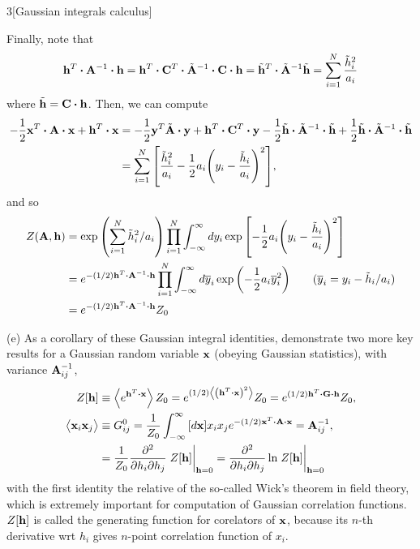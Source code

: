 \documentclass[12pt]{article}
\begin{document}
\begin{problem}{3}[Gaussian integrals calculus]
\begin{solution}
Finally, note that
\begin{equation}
    \vb{h}^T\vdot\vb{A}^{-1}\vdot\vb{h}
    =\vb{h}^T\vdot\vb{C}^T\vdot\tilde{\vb{A}}^{-1}\vdot\vb{C}\vdot\vb{h}
    =\tilde{\vb{h}}^T\vdot\tilde{\vb{A}}^{-1}\tilde{\vb{h}}
    =\sum_{i=1}^N\frac{\tilde{h}_i^2}{a_i}
\end{equation}
where $\tilde{\vb{h}}=\vb{C}\vdot\vb{h}$.  Then, we can compute
\begin{align}
    -\frac12\vb{x}^T\vdot\vb{A}\vdot\vb{x}+\vb{h}^T\vdot\vb{x}
    &=-\frac12\vb{y}^T\tilde{\vb{A}}\vdot\vb{y}
    +\vb{h}^T\vdot\vb{C}^T\vdot\vb{y}
    -\frac12\tilde{\vb{h}}\vdot\tilde{\vb{A}}^{-1}\vdot\tilde{\vb{h}}
    +\frac12\tilde{\vb{h}}\vdot\tilde{\vb{A}}^{-1}\vdot\tilde{\vb{h}}
    \notag\\
    &=\sum_{i=1}^N\qty[\frac{\tilde{h}_i^2}{a_i}-\frac12a_i\qty(y_i-\frac{\tilde{h}_i}{a_i})^2],
\end{align}
and so
\begin{align}
    Z(\vb{A},\vb{h})
    &=\exp\qty(\sum_{i=1}^{N}\tilde{h}_i^2/a_i)
    \prod_{i=1}^N\int_{-\infty}^\infty
    dy_i\exp\qty[-\frac12a_i\qty(y_i-\frac{\tilde{h}_i}{a_i})^2]\notag\\
    &=e^{-(1/2)\vb{h}^T\vdot\vb{A}^{-1}\vdot\vb{h}}
    \prod_{i=1}^N\int_{-\infty}^\infty
    d\overline{y}_i\exp\qty(-\frac12a_i\overline{y}_i^2)\tag{$\overline{y}_i=y_i-\tilde{h}_i/a_i$}\\
    &=e^{-(1/2)\vb{h}^T\vdot\vb{A}^{-1}\vdot\vb{h}}Z_0
\end{align}
\end{solution}

(e) As a corollary of these Gaussian integral identities, demonstrate two more
key results for a Gaussian random variable $\vb{x}$ (obeying Gaussian
statistics), with variance $\vb{A}_{ij}^{-1}$,
\begin{align}
    Z\qty[\vb{h}]&\equiv\expval{e^{\vb{h}^T\vdot\vb{x}}}Z_0
    =e^{(1/2)\expval{\qty(\vb{h}^T\vdot\vb{x})^2}}Z_0
    =e^{(1/2)\vb{h}^T\vdot\vb{G}\vdot\vb{h}}Z_0,\\
    \expval{\vb{x}_i\vb{x}_j}
                 &\equiv
                 G_{ij}^0=\frac1{Z_0}\int_{-\infty}^\infty\qty[d\vb{x}]x_ix_je^{-(1/2)\vb{x}^T\vdot\vb{A}\vdot\vb{x}}
                 =\vb{A}_{ij}^{-1},\\
                 &=\frac1{Z_0}\frac{\partial^2}{\partial h_i\partial
             h_j}\eval{Z\qty[\vb{h}]}_{\vb{h}=0}
             =\frac{\partial^2}{\partial h_i\partial h_j}\ln
             \eval{Z[\vb{h}]}_{\vb{h}=0}
\end{align}
with the first identity the relative of the so-called Wick's theorem in field
theory, which is extremely important for computation of Gaussian correlation
functions. $Z\qty[\vb{h}]$ is called the generating function for corelators of
$\vb{x}$, because its $n$-th derivative wrt $h_i$ gives $n$-point correlation
function of $x_i$. 


\end{problem}
\end{document}
